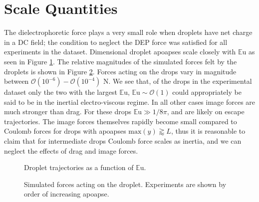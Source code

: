 \documentclass[12pt,a4paper,oneside]{book}
\begin{document}
\section{Scale Quantities}
The dielectrophoretic force plays a very small role when droplets have net charge in a DC field; the condition to neglect the DEP force was satisfied for all experiments in the dataset. Dimensional droplet apoapses scale closely with $\mathbb{E}\mbox{u}$ as seen in Figure \ref{fig:series_s_eu}. The relative magnitudes of the simulated forces felt by the droplets is shown in Figure \ref{fig:forces}. Forces acting on the drops vary in magnitude between $\mathcal{O}(10^{-6})-\mathcal{O}(10^{-4})$ N. We see that, of the drops in the experimental dataset only the two with the largest $\mathbb{E}\mbox{u}$, $\mathbb{E}\mbox{u} \sim \mathcal{O}(1)$ could appropriately be said to be in the inertial electro-viscous regime. In all other cases image forces are much stronger than drag. For these drops $\mathbb{E}\mbox{u} \gg 1/8 \pi$, and are likely on escape trajectories. The image forces themselves rapidly become small compared to Coulomb forces for drops with apoapses $\mbox{max}\left( y\right) \gtrapprox L$, thus it is reasonable to claim that for intermediate drops Coulomb force scales as inertia, and we can neglect the effects of drag and image forces.

\begin{figure}[htb]
    \centering
    
    \caption{Droplet trajectories as a function of $\mathbb{E}\mbox{u}$.\label{fig:series_s_eu}}
\end{figure}
\begin{figure}[htb]
    \centering
    \resizebox{14cm}{!}{}
    \caption{Simulated forces acting on the droplet. Experiments are shown by order of increasing apoapse.\label{fig:forces}}
\end{figure}
\end{document}
